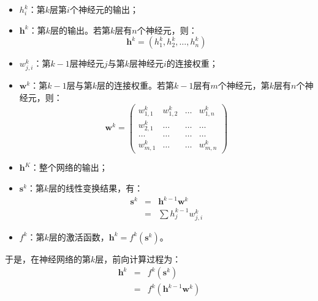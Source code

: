 \begin{itemize}
\vspace{0.5em}
\item  $ h_i^k $：第$ k $层第$ i $个神经元的输出；
\vspace{0.5em}
\item  $ \mathbf h^k $：第$ k $层的输出。若第$ k $层有$ n $个神经元，则：
       \begin{equation}
       \mathbf h^k=(h_1^k,h_2^k,\dots,h_n^k)
       \end{equation}
\vspace{0.5em}
\item  $ w_{j,i}^k $：第$ k-1 $层神经元$ j $与第$ k $层神经元$ i $的连接权重；
\vspace{0.5em}
\item  $ \mathbf w^k $：第$ k-1 $层与第$ k $层的连接权重。若第$ k-1 $层有$ m $个神经元，第$ k $层有$ n $个神经元，则：
       \begin{equation}
       \mathbf w^k = \begin{pmatrix} w_{1,1}^k & w_{1,2}^k & \dots & w_{1,n}^k\\w_{2,1}^k & \dots & \dots & \dots\\ \dots & \dots & \dots & \dots\\w_{m,1}^k & \dots & \dots & w_{m,n}^k\end{pmatrix}
       \end{equation}
\vspace{0.5em}
\item  $ \mathbf h^K $：整个网络的输出；
\vspace{0.5em}
\item  $ \mathbf s^k $：第$ k $层的线性变换结果，有：
       \begin{eqnarray}
       \mathbf s^k & = & \mathbf h^{k-1}\mathbf w^k \nonumber \\
                   & = & \sum{h_j^{k-1}w_{j,i}^k}
       \end{eqnarray}
\vspace{0.5em}
\item  $ f^k $：第$ k $层的激活函数，$ \mathbf h^k=f^k(\mathbf s^k)$。
\vspace{0.5em}
\end{itemize}

\parinterval  于是，在神经网络的第$ k $层，前向计算过程为：
\begin{eqnarray}
\mathbf h^k & = & f^k(\mathbf s^k) \nonumber \nonumber \\
            & = & f^k(\mathbf h^{k-1}\mathbf w^k)
\label{eq:5-46}
\end{eqnarray}

